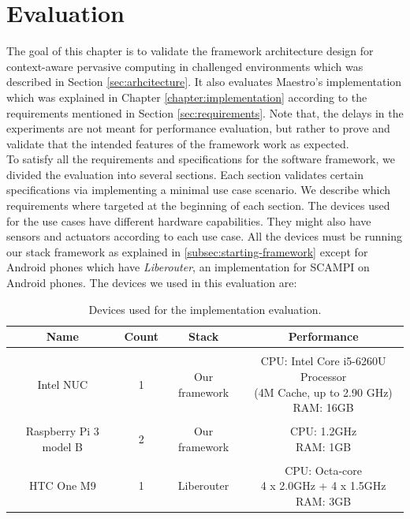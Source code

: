 
\chapter{Evaluation}\label{chapter:Evaluation}

The goal of this chapter is to validate the framework architecture design for context-aware pervasive computing in challenged environments which was described in Section \ref{sec:arhcitecture}. It also evaluates Maestro's implementation which was explained in Chapter \ref{chapter:implementation} according to the requirements mentioned in Section \ref{sec:requirements}. Note that, the delays in the experiments are not meant for performance evaluation, but rather to prove and validate that the intended features of the framework work as expected. \\

\noindent To satisfy all the requirements and specifications for the software framework, we divided the evaluation into several sections. Each section validates certain specifications via implementing a minimal use case scenario. We describe which requirements where targeted at the beginning of each section. The devices used for  the use cases have different hardware capabilities. They might also have  sensors and actuators according to each use case. All the devices must be running our stack framework as explained in \ref{subsec:starting-framework} except for Android phones which have \textit{Liberouter}, an implementation for SCAMPI on Android phones. The devices we used in this evaluation are:
\begin{table}[!ht]
	\centering
	\begin{tabular}{*{4}{c}}\toprule
		Name & Count & Stack & Performance \\ \hline
		 &  &  &  \\
		Intel NUC &1& 	Our framework &   \specialcell[c]{CPU: Intel Core i5-6260U Processor\\ (4M Cache, up to 2.90 GHz)\\RAM: 16GB }\\ 
		&  &  &  \\
		Raspberry Pi 3 model B & 2 & Our framework &  \specialcell[c]{ CPU: 1.2GHz\\RAM: 1GB}  \\ 
		&  &  &  \\
		HTC One M9 & 1 & Liberouter &   \specialcell[c]{CPU: Octa-core \\4 x 2.0GHz + 4 x 1.5GHz\\ RAM: 3GB} \\ \hline

\end{tabular}
\caption{Devices used for the implementation evaluation.}
\label{table:devoces}
\end{table}

